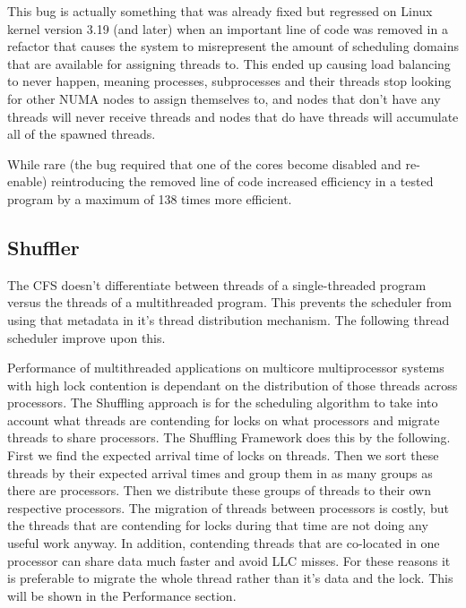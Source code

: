 \documentclass{sig-alternate}
\begin{document}
This bug is actually something that was already fixed but regressed on Linux kernel version 3.19 (and later) when an important line of code was removed in a refactor that causes the system to misrepresent the amount of scheduling domains that are available for assigning threads to. This ended up causing load balancing to never happen, meaning processes, subprocesses and their threads stop looking for other NUMA nodes to assign themselves to, and nodes that don't have any threads will never receive threads and nodes that do have threads will accumulate all of the spawned threads.

While rare (the bug required that one of the cores become disabled and re-enable) reintroducing the removed line of code increased efficiency in a tested program by a maximum of 138 times more efficient.~\cite{Lozi:2016}

\subsection{Shuffler}
\label{sec:shuffler}

The CFS doesn't differentiate between threads of a single-threaded program versus the threads of a multithreaded program. This prevents the scheduler from using that metadata in it's thread distribution mechanism. The following thread scheduler improve upon this.

Performance of multithreaded applications on multicore multiprocessor systems with high lock contention is dependant on the distribution of those threads across processors. The Shuffling approach is for the scheduling algorithm to take into account what threads are contending for locks on what processors and migrate threads to share processors. The Shuffling Framework does this by the following. First we find the expected arrival time of locks on threads. Then we sort these threads by their expected arrival times and group them in as many groups as there are processors. Then we distribute these groups of threads to their own respective processors. The migration of threads between processors is costly, but the threads that are contending for locks during that time are not doing any useful work anyway. In addition, contending threads that are co-located in one processor can share data much faster and avoid LLC misses. For these reasons it is preferable to migrate the whole thread rather than it's data and the lock. This will be shown in the Performance section.~\cite{KumarEtal:2014}
\end{document}
